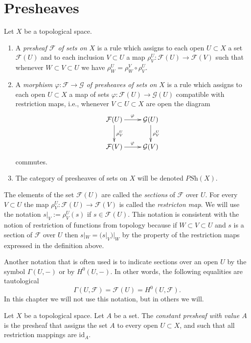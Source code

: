 \section{Presheaves}
\label{section-presheaves}


\begin{definition}
\label{definition-presheaf}
Let $X$ be a topological space.
\begin{enumerate}
\item A {\it presheaf $\mathcal{F}$ of sets on $X$} is a rule which
assigns to each open $U \subset X$ a set $\mathcal{F}(U)$ and
to each inclusion $V \subset U$ a map
$\rho^U_V : \mathcal{F}(U) \to \mathcal{F}(V)$ such that
whenever $W \subset V \subset U$ we have
$\rho^U_W = \rho^V_W \circ \rho ^U_V$.
\item A {\it morphism $\varphi : \mathcal{F} \to \mathcal{G}$
of presheaves of sets on $X$} is a rule which assigns to each
open $U \subset X$ a map of sets $\varphi : \mathcal{F}(U)
\to \mathcal{G}(U)$ compatible with restriction maps,
i.e., whenever $V \subset U \subset X$ are open the
diagram
$$
\xymatrix{
\mathcal{F}(U) \ar[r]^\varphi \ar[d]^{\rho^U_V} &
\mathcal{G}(U) \ar[d]^{\rho^U_V} \cr
\mathcal{F}(V) \ar[r]^\varphi & \mathcal{G}(V)
}
$$
commutes.
\item The category of presheaves of sets on $X$ will be denoted
$\textit{PSh}(X)$.
\end{enumerate}
\end{definition}

\noindent
The elements of the set $\mathcal{F}(U)$ are called
the {\it sections} of $\mathcal{F}$ over $U$.
For every $V \subset U$ the map
$\rho^U_V : \mathcal{F}(U) \to \mathcal{F}(V)$
is called the {\it restricton map}. We will use the
notation $s|_V := \rho^U_V(s)$ if $s\in \mathcal{F}(U)$.
This notation is consistent with the notion of restriction
of functions from topology because if $W \subset V \subset U$
and $s$ is a section of $\mathcal{F}$ over $U$ then
$s|_W = (s|_V)|_W$ by the property of the restriction maps
expressed in the definition above.

\medskip\noindent
Another notation that is often used is to indicate sections
over an open $U$ by the symbol $\Gamma(U, -)$ or by
$H^0(U, -)$. In other words, the following equalities
are tautological
$$
\Gamma(U, \mathcal{F}) = \mathcal{F}(U) = H^0(U, \mathcal{F}).
$$
In this chapter we will not use this notation, but in others
we will.

\begin{definition}
\label{definition-constant-presheaf}
Let $X$ be a topological space. Let $A$ be a set.
The {\it constant presheaf with value $A$} is the
presheaf that assigns the set $A$ to every open
$U \subset X$, and such that all restriction mappings
are $\text{id}_A$.
\end{definition}

